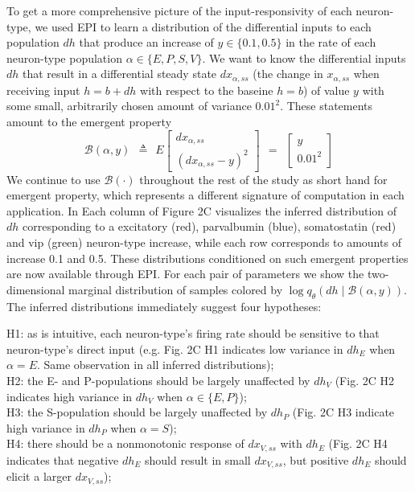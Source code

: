 \documentclass[11pt]{article}
\begin{document}
To get a more comprehensive picture of the input-responsivity of each neuron-type, we used EPI to learn a distribution of the differential inputs to each population $dh$ that produce an increase of $y \in \{0.1, 0.5\}$ in the rate of each neuron-type population $\alpha \in \{E, P, S, V \}$.  
We want to know the differential inputs $dh$ that result in a differential steady state $dx_{\alpha,ss}$ (the change in $x_{\alpha,ss}$ when receiving input $h=b + dh$ with respect to the baseine $h = b$) of value $y$ with some small, arbitrarily chosen amount of variance  $0.01^2$.   
These statements amount to the emergent property 
\begin{equation}
\mathcal{B}(\alpha, y) ~~\triangleq~~ 
E \begin{bmatrix} dx_{\alpha,ss} \\ (dx_{\alpha,ss} - y)^2 \end{bmatrix} ~~=~~ \begin{bmatrix} y \\ 0.01^2 \end{bmatrix}
\end{equation}
We continue to use $\mathcal{B}(\cdot)$ throughout the rest of the study as short hand for emergent property, which represents a different signature of computation in each application. In Each column of Figure 2C visualizes the inferred distribution of $dh$ corresponding to a excitatory (red), parvalbumin (blue), somatostatin (red) and vip (green) neuron-type increase, while each row corresponds to amounts of increase 0.1 and 0.5.  These distributions conditioned on such emergent properties are now available through EPI. For each pair of parameters we show the two-dimensional marginal distribution of samples colored by $\log q_\theta(dh \mid \mathcal{B}(\alpha, y))$.  The inferred distributions immediately suggest four hypotheses: \\

{\addtolength{\leftskip}{10 mm}
H1: as is intuitive, each neuron-type's firing rate should be sensitive to that neuron-type's direct input (e.g. Fig. 2C H1 indicates low variance in $dh_E$ when $\alpha=E$. Same observation in all inferred distributions); \\
H2: the E- and P-populations should be largely unaffected by $dh_V$ (Fig. 2C H2 indicates high variance in $dh_V$ when $\alpha \in \{E, P \}$); \\
H3: the S-population should be largely unaffected by $dh_P$  (Fig. 2C H3 indicate high variance in $dh_P$ when $\alpha =S$); \\
H4: there should be a nonmonotonic response of $dx_{V,ss}$ with $dh_{E}$ (Fig. 2C H4 indicates that negative $dh_E$ should result in small $dx_{V,ss}$, but positive $dh_E$ should elicit a larger $dx_{V,ss}$);

}
\end{document}
